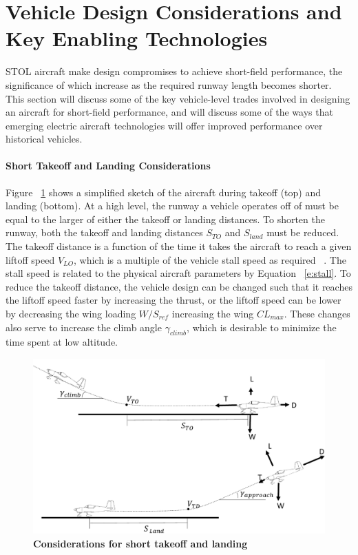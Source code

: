 \documentclass[]{aiaa-tc}%
\begin{document}
\section{Vehicle Design Considerations and Key Enabling Technologies}
STOL aircraft make design compromises to achieve short-field performance, the significance of which increase as the required runway length becomes shorter.  This section will discuss some of the key vehicle-level trades involved in designing an aircraft for short-field performance, and will discuss some of the ways that emerging electric aircraft technologies will offer improved performance over historical vehicles. 


\paragraph{Short Takeoff and Landing Considerations}
Figure ~\ref{f:takeoff} shows a simplified sketch of the aircraft during takeoff (top) and landing (bottom).  At a high level, the runway a vehicle operates off of must be equal to the larger of either the takeoff or landing distances.  To shorten the runway, both the takeoff and landing distances $S_{TO}$ and $S_{land}$ must be reduced.  The takeoff distance is a function of the time it takes the aircraft to reach a given liftoff speed $V_{LO}$, which is a multiple of the vehicle stall speed as required ~\cite{ASTM3179}.  The stall speed is related to the physical aircraft parameters by Equation ~\ref{e:stall}.  To reduce the takeoff distance, the vehicle design can be changed such that it reaches the liftoff speed faster by increasing the thrust, or the liftoff speed can be lower by decreasing the wing loading $W/S_{ref}$ increasing the wing $CL_{max}$.  These changes also serve to increase the climb angle $\gamma_{climb}$, which is desirable to minimize the time spent at low altitude. 
\begin{figure}[h!]
	\begin{center}
	\includegraphics[width=1.0\textwidth]{takeoff_fig.pdf}
    \caption{\textbf{Considerations for short takeoff and landing}}
	\label{f:takeoff}
	\end{center}
\end{figure}
\end{document}
